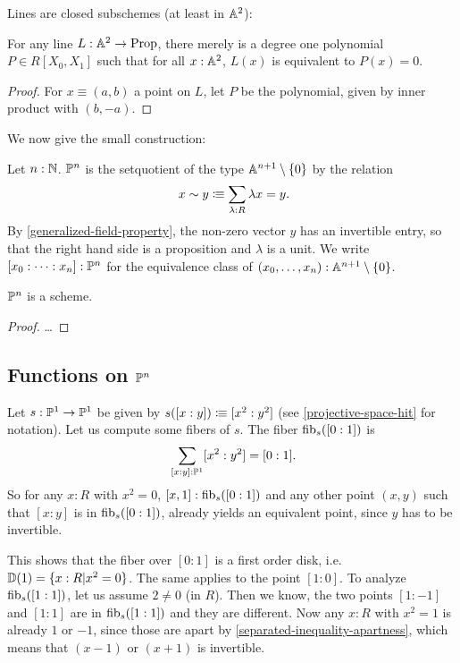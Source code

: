 Lines are closed subschemes (at least in $\mathbb{A}^2$):

\begin{proposition}%
  For any line $L : \mathbb{A}^{2}\to \mathrm{Prop}$, there merely is a degree one polynomial $P\in R[X_0,X_1]$ such that
  for all $x:\mathbb{A}^{2}$, $L(x)$ is equivalent to $P(x)=0$.
\end{proposition}

\begin{proof}
  For $x\equiv(a,b)$ a point on $L$,
  let $P$ be the polynomial, given by inner product with $(b,-a)$. 
\end{proof}

We now give the small construction:

\begin{definition}%
  \label{projective-space-hit}
  Let $n:\mathbb{N}$.
   $\mathbb{P}^n$ is the setquotient of the type $\mathbb{A}^{n+1}\setminus\{0\}$ by the relation
  \[
    x \sim y \colonequiv \sum_{\lambda : R} \lambda x=y\rlap{.}
  \]
  By \cref{generalized-field-property}, the non-zero vector $y$ has an invertible entry,
  so that the right hand side is a proposition and $\lambda$ is a unit.
  We write $[x_0:\dots:x_n]:\mathbb{P}^n$ for the equivalence class of $(x_0,\dots,x_n):\mathbb{A}^{n+1}\setminus\{0\}$.
\end{definition}

\begin{theorem}
  $\mathbb{P}^n$ is a scheme.
\end{theorem}

\begin{proof}
  \dots
\end{proof}

\subsection{Functions on $\mathbb{P}^n$}

\begin{example}
  Let $s:\mathbb{P}^1\to \mathbb{P}^1$ be given by $s([x:y])\vcentcolon\mspace{-1.2mu}\equiv [x^2:y^2]$
  (see \cref{projective-space-hit} for notation).
  Let us compute some fibers of $s$. The fiber $\mathrm{fib}_s([0:1])$ is
  \[
    \sum_{[x:y]:\bP^1}[x^2:y^2]=[0:1]\rlap{.}
  \]
  So for any $x:R$ with $x^2=0$, $[x,1]:\mathrm{fib}_s([0:1])$  and
  any other point $(x,y)$ such that $[x:y]$ is in $\mathrm{fib}_s([0:1])$,
  already yields an equivalent point, since $y$ has to be invertible.

  This shows that the fiber over $[0:1]$ is a first order disk, i.e. $\mathbb{D}(1)=\{x:R|x^2=0\}$.
  The same applies to the point $[1:0]$.
  To analyze $\mathrm{fib}_s([1:1])$, let us assume $2\neq 0$ (in $R$).
  Then we know, the two points $[1:-1]$ and $[1:1]$ are in $\mathrm{fib}_s([1:1])$ and they are different.
  Now any $x:R$ with $x^2=1$ is already $1$ or $-1$,
  since those are apart by \cref{separated-inequality-apartness}, which means that $(x-1)$ or $(x+1)$ is invertible.  
\end{example}

